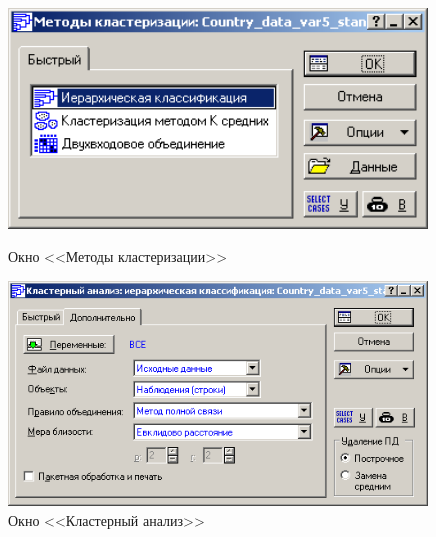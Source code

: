 \begin{figure}[!h]
  \centering
  \begin{minipage}{0.49\textwidth}
    \centering

    \includegraphics[width=0.99\textwidth]
    {inc/cars_my/var5__1_3.PNG}

    \caption{Окно <<Методы кластеризации>>}
    \label{fig:var5__1_3}
  \end{minipage}
  \begin{minipage}{0.49\textwidth}
    \centering

    \includegraphics[width=0.99\textwidth]
    {inc/cars_my/var5__1_4.PNG}

    \caption{Окно <<Кластерный анализ>>}
    \label{fig:var5__1_4}
  \end{minipage}
\end{figure}

